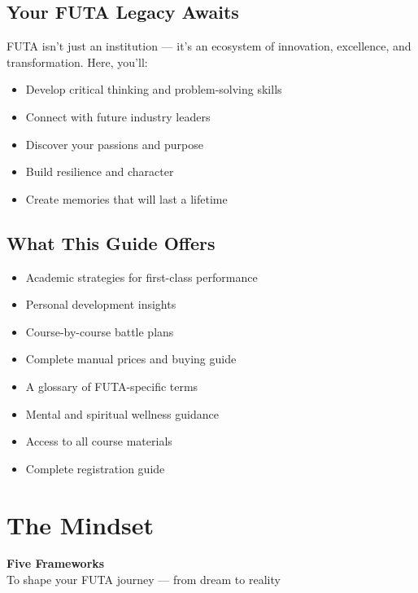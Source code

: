\documentclass[11pt,a4paper]{article}
\begin{document}
\subsection*{Your FUTA Legacy Awaits}

FUTA isn't just an institution --- it's an ecosystem of innovation, excellence, and transformation. Here, you'll:

\begin{itemize}[leftmargin=1.5em, itemsep=0.3em]
    \item Develop critical thinking and problem-solving skills
    \item Connect with future industry leaders
    \item Discover your passions and purpose
    \item Build resilience and character
    \item Create memories that will last a lifetime
\end{itemize}

\subsection*{What This Guide Offers}

\begin{itemize}[leftmargin=1.5em, itemsep=0.3em]
    \item Academic strategies for first-class performance
    \item Personal development insights
    \item Course-by-course battle plans
    \item Complete manual prices and buying guide
    \item A glossary of FUTA-specific terms
    \item Mental and spiritual wellness guidance
    \item Access to all course materials
    \item Complete registration guide
\end{itemize}

\newpage
\section*{The Mindset}

\begin{center}
    {\color{primary}\Huge\bfseries Five Frameworks}\\[0.3em]
    {\color{textGray}\large To shape your FUTA journey --- from dream to reality}
\end{center}
\end{document}
